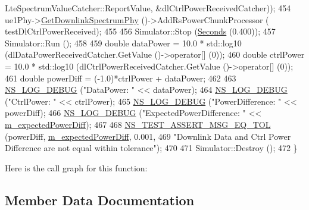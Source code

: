 \begin{DoxyCode}
      LteSpectrumValueCatcher::ReportValue, &dlCtrlPowerReceivedCatcher));
454   ue1Phy->\hyperlink{classns3_1_1LtePhy_a9560f8862545c7c5760e7f6737c5b938}{GetDownlinkSpectrumPhy} ()->AddRsPowerChunkProcessor (
      testDlCtrlPowerReceived);
455 
456   Simulator::Stop (\hyperlink{group__timecivil_ga33c34b816f8ff6628e33d5c8e9713b9e}{Seconds} (0.400));
457   Simulator::Run ();
458 
459   \textcolor{keywordtype}{double} dataPower = 10.0 * std::log10 (dlDataPowerReceivedCatcher.GetValue ()->operator[] (0));
460   \textcolor{keywordtype}{double} ctrlPower = 10.0 * std::log10 (dlCtrlPowerReceivedCatcher.GetValue ()->operator[] (0));
461   \textcolor{keywordtype}{double} powerDiff = (-1.0)*ctrlPower + dataPower;
462 
463   \hyperlink{group__logging_ga413f1886406d49f59a6a0a89b77b4d0a}{NS\_LOG\_DEBUG} (\textcolor{stringliteral}{"DataPower: "} << dataPower);
464   \hyperlink{group__logging_ga413f1886406d49f59a6a0a89b77b4d0a}{NS\_LOG\_DEBUG} (\textcolor{stringliteral}{"CtrlPower: "} << ctrlPower);
465   \hyperlink{group__logging_ga413f1886406d49f59a6a0a89b77b4d0a}{NS\_LOG\_DEBUG} (\textcolor{stringliteral}{"PowerDifference: "} << powerDiff);
466   \hyperlink{group__logging_ga413f1886406d49f59a6a0a89b77b4d0a}{NS\_LOG\_DEBUG} (\textcolor{stringliteral}{"ExpectedPowerDifference: "} << \hyperlink{classLteDownlinkPowerControlTestCase_a02131214e45a4ecd49f1a8d3b9b65675}{m\_expectedPowerDiff});
467 
468   \hyperlink{group__testing_ga9e7861b56b4e70db3b56044cb7a28e41}{NS\_TEST\_ASSERT\_MSG\_EQ\_TOL} (powerDiff, 
      \hyperlink{classLteDownlinkPowerControlTestCase_a02131214e45a4ecd49f1a8d3b9b65675}{m\_expectedPowerDiff}, 0.001,
469                              \textcolor{stringliteral}{"Downlink Data and Ctrl Power Difference are not equal within tolerance"});
470 
471   Simulator::Destroy ();
472 \}
\end{DoxyCode}


Here is the call graph for this function\+:




\subsection{Member Data Documentation}

